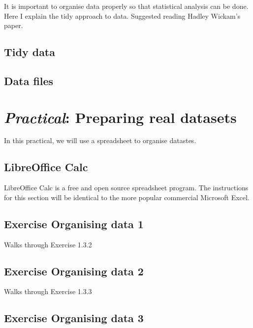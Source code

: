\documentclass[
]{book}
\begin{document}
It is important to organise data properly so that statistical analysis can be done. Here I explain the tidy approach to data. Suggested reading Hadley Wickam's paper.

\hypertarget{tidy-data}{%
\section{Tidy data}\label{tidy-data}}

\hypertarget{data-files}{%
\section{Data files}\label{data-files}}

\hypertarget{practical-preparing-real-datasets}{%
\chapter{\texorpdfstring{\emph{Practical}: Preparing real datasets}{Practical: Preparing real datasets}}\label{practical-preparing-real-datasets}}

In this practical, we will use a spreadsheet to organise datastes.

\hypertarget{libreoffice-calc}{%
\section{LibreOffice Calc}\label{libreoffice-calc}}

LibreOffice Calc is a free and open source spreadsheet program. The instructions for this section will be identical to the more popular commercial Microsoft Excel.

\hypertarget{exercise-organising-data-1}{%
\section{Exercise Organising data 1}\label{exercise-organising-data-1}}

Walks through Exercise 1.3.2

\hypertarget{exercise-organising-data-2}{%
\section{Exercise Organising data 2}\label{exercise-organising-data-2}}

Walks through Exercise 1.3.3

\hypertarget{exercise-organising-data-3}{%
\section{Exercise Organising data 3}\label{exercise-organising-data-3}}
\end{document}
